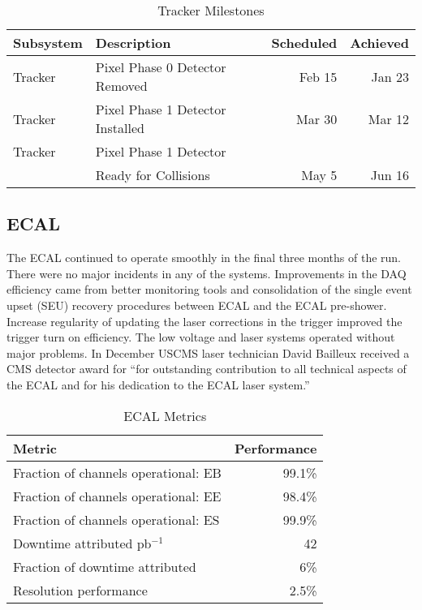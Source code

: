 \documentclass[12pt]{article}
\begin{document}
\begin{table}[htp]
\caption{Tracker Milestones}
\begin{center}
\begin{tabular}{|l|l|r|r|}
\hline
Subsystem&Description&Scheduled&Achieved\\
\hline
Tracker & Pixel Phase 0 Detector Removed&Feb 15&Jan 23 \\
\hline
Tracker & Pixel Phase 1 Detector Installed &Mar 30 &Mar 12 \\
\hline
Tracker & Pixel Phase 1 Detector & & \\ 
        & Ready for Collisions  &May 5 & Jun 16\\
\hline
\end{tabular}
\end{center}
\label{TrackerMilestones}
\end{table}%



\subsection{ECAL }
The ECAL continued to operate smoothly in the final three months of the run. There were no major incidents in any of the systems. Improvements in the DAQ efficiency came from better monitoring tools and consolidation of the single event upset (SEU) recovery procedures between ECAL and the ECAL pre-shower. Increase regularity of updating the laser corrections in the trigger improved the trigger turn on efficiency. The low voltage and laser systems operated without major problems. In December USCMS laser technician David Bailleux received a CMS detector award for “for outstanding contribution to all technical aspects of the ECAL and for his dedication to the ECAL laser system.”


\begin{table}[htp]
\caption{ECAL Metrics}
\begin{center}
\begin{tabular}{|l|r|}
\hline
Metric&Performance\\
\hline
Fraction of channels operational: EB& 99.1\% \\
\hline
Fraction of channels operational: EE& 98.4\%\\
\hline
Fraction of channels operational: ES& 99.9\%\\
\hline
Downtime attributed pb$^{-1}$ & 42 \\
Fraction of downtime attributed& 6\% \\
\hline
Resolution performance & 2.5\% \\
\hline
\end{tabular}
\end{center}
\label{ECALMetrics}
\end{table}%
\end{document}
